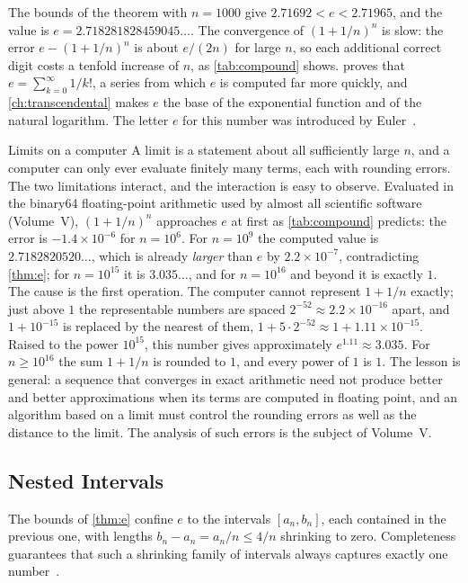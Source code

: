 The bounds of the theorem with $n=1000$ give $2.71692<e<2.71965$, and the value is $e=2.718281828459045\ldots$. The convergence of $(1+1/n)^n$ is slow: the error $e-(1+1/n)^n$ is about $e/(2n)$ for large $n$, so each additional correct digit costs a tenfold increase of $n$, as \cref{tab:compound} shows.  proves that $e=\sum_{k=0}^\infty1/k!$, a series from which $e$ is computed far more quickly, and \cref{ch:transcendental} makes $e$ the base of the exponential function and of the natural logarithm. The letter $e$ for this number was introduced by Euler~\cite{maor1994}.

\begin{note}{Limits on a computer}
A limit is a statement about all sufficiently large $n$, and a computer can only ever evaluate finitely many terms, each with rounding errors. The two limitations interact, and the interaction is easy to observe. Evaluated in the binary64 floating-point arithmetic used by almost all scientific software (Volume~V), $(1+1/n)^n$ approaches $e$ at first as \cref{tab:compound} predicts: the error is $-1.4\times10^{-6}$ for $n=10^6$. For $n=10^9$ the computed value is $2.7182820520\ldots$, which is already \emph{larger} than $e$ by $2.2\times10^{-7}$, contradicting \cref{thm:e}; for $n=10^{15}$ it is $3.035\ldots$, and for $n=10^{16}$ and beyond it is exactly $1$. The cause is the first operation. The computer cannot represent $1+1/n$ exactly; just above $1$ the representable numbers are spaced $2^{-52}\approx2.2\times10^{-16}$ apart, and $1+10^{-15}$ is replaced by the nearest of them, $1+5\cdot2^{-52}\approx1+1.11\times10^{-15}$. Raised to the power $10^{15}$, this number gives approximately $e^{1.11}\approx3.035$. For $n\ge10^{16}$ the sum $1+1/n$ is rounded to $1$, and every power of $1$ is $1$. The lesson is general: a sequence that converges in exact arithmetic need not produce better and better approximations when its terms are computed in floating point, and an algorithm based on a limit must control the rounding errors as well as the distance to the limit. The analysis of such errors is the subject of Volume~V.
\end{note}

\subsection{Nested Intervals}

The bounds of \cref{thm:e} confine $e$ to the intervals $[a_n,b_n]$, each contained in the previous one, with lengths $b_n-a_n=a_n/n\le4/n$ shrinking to zero. Completeness guarantees that such a shrinking family of intervals always captures exactly one number~\cite{abbott2015}.

